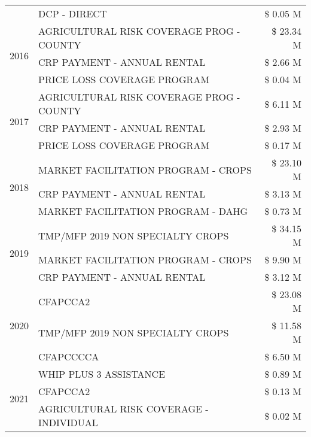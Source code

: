 \begin{tabular}{llr}
 & DCP - DIRECT & \$ 0.05 M \\
\cline{1-3}
\multirow[t]{3}{*}{2016} & AGRICULTURAL RISK COVERAGE PROG - COUNTY      & \$ 23.34 M \\
 & CRP PAYMENT - ANNUAL RENTAL                   & \$ 2.66 M \\
 & PRICE LOSS COVERAGE PROGRAM                   & \$ 0.04 M \\
\cline{1-3}
\multirow[t]{3}{*}{2017} & AGRICULTURAL RISK COVERAGE PROG - COUNTY & \$ 6.11 M \\
 & CRP PAYMENT - ANNUAL RENTAL & \$ 2.93 M \\
 & PRICE LOSS COVERAGE PROGRAM & \$ 0.17 M \\
\cline{1-3}
\multirow[t]{3}{*}{2018} & MARKET FACILITATION PROGRAM - CROPS & \$ 23.10 M \\
 & CRP PAYMENT - ANNUAL RENTAL & \$ 3.13 M \\
 & MARKET FACILITATION PROGRAM - DAHG & \$ 0.73 M \\
\cline{1-3}
\multirow[t]{3}{*}{2019} & TMP/MFP 2019 NON SPECIALTY CROPS & \$ 34.15 M \\
 & MARKET FACILITATION PROGRAM - CROPS & \$ 9.90 M \\
 & CRP PAYMENT - ANNUAL RENTAL & \$ 3.12 M \\
\cline{1-3}
\multirow[t]{3}{*}{2020} & CFAPCCA2 & \$ 23.08 M \\
 & TMP/MFP 2019 NON SPECIALTY CROPS & \$ 11.58 M \\
 & CFAPCCCCA & \$ 6.50 M \\
\cline{1-3}
\multirow[t]{3}{*}{2021} & WHIP PLUS 3 ASSISTANCE & \$ 0.89 M \\
 & CFAPCCA2 & \$ 0.13 M \\
 & AGRICULTURAL RISK COVERAGE - INDIVIDUAL & \$ 0.02 M \\
\cline{1-3}
\bottomrule
\end{tabular}
